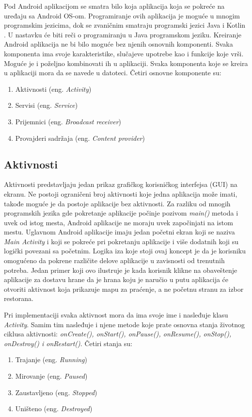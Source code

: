 \documentclass[android.tex]{subfiles}
\begin{document}
Pod Android aplikacijom se smatra bilo koja aplikacija koja se pokreće na uređaju sa Android OS-om. Programiranje ovih aplikacija je moguće u mnogim programskim jezicima, dok se zvaničnim smatraju programski jezici Java i Kotlin \cite{sajt:kotlin}. U nastavku će biti reči o programiranju u Java programskom jeziku. 
Kreiranje Android aplikacija ne bi bilo moguće bez njenih osnovnih komponenti. Svaka komponenta ima svoje karakteristike, slučajeve upotrebe kao i funkcije koje vrši. Moguće je i poželjno kombinovati ih u aplikaciji. Svaka komponenta koje se kreira u aplikaciji mora da se navede u  datoteci. Četiri osnovne komponente su:

\begin{enumerate}
\item Aktivnosti (eng. \textit{Activity})
\item Servisi (eng. \textit{Service})
\item Prijemnici (eng. \textit{Broadcast receiver})
\item Provajderi sadržaja (eng. \textit{Content provider})
\end{enumerate}

\subsection{Aktivnosti}
Aktivnosti predstavljaju jedan prikaz grafičkog korisničkog interfejsa (GUI) na ekranu. Ne postoji ograničeni broj aktivnosti koje jedna aplikacija može imati, takođe moguće je da postoje aplikacije bez aktivnosti. Za razliku od mnogih programskih jezika gde pokretanje aplikacije počinje pozivom \textit{main() }metoda i uvek od istog mesta, Android aplikacije ne moraju uvek započinjati na istom mestu. Uglavnom Android aplikacije imaju jedan početni ekran koji se naziva \textit{Main Activity} i  koji se pokreće pri pokretanju aplikacije i više dodatnih koji su logički povezani sa početnim. Logika iza koje stoji ovaj koncept je da je korisniku omogućeno da pokrene različite delove aplikacije u zavisnosti od trenutnih potreba. Jedan primer koji ovo ilustruje je kada korisnik klikne na obaveštenje aplikacije za dostavu hrane da je hrana koju je naručio u putu aplikacija će otvoriti aktivnost koja prikazuje mapu za praćenje, a ne početnu stranu za izbor restorana.

Pri implementaciji svaka aktivnost mora da ima svoje ime i nasleđuje klasu \textit{Activity}. Samim tim nasleđuje i njene metode koje prate osnovna stanja životnog ciklusa aktivnosti: \textit{onCreate(), onStart(), onPause(), onResume(), onStop(), onDestroy() i onRestart()}\cite{book:and9cookbook}. Četiri stanja su:
\begin{enumerate}
    \item Trajanje (eng. \textit{Running})
    \item Mirovanje (eng.\textit{ Paused})
    \item Zaustavljeno (eng. \textit{Stopped})
    \item Uništeno (eng. \textit{Destroyed})
\end{enumerate}
\end{document}
